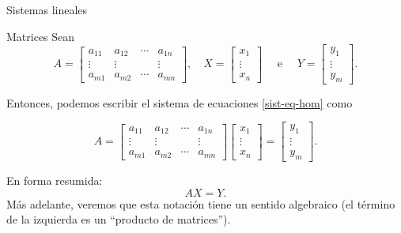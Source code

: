 \begin{chapter}{Sistemas lineales}
\begin{section}{Matrices}
            Sean
            \begin{equation*}
                A = \begin{bmatrix}
                    a_{11}& a_{12}& \cdots &a_{1n} \\
                    \vdots&\vdots  &  &\vdots \\
                    a_{m1} &a_{m2}&\cdots &a_{mn}
                    \end{bmatrix}, \quad 
                    X = \begin{bmatrix}
                    x_1 \\ \vdots \\ x_n
                    \end{bmatrix}\quad \text{ e } \quad
                    Y = \begin{bmatrix}
                    y_1 \\ \vdots \\ y_m
                    \end{bmatrix}. 
            \end{equation*}
                
            Entonces, podemos escribir el sistema de ecuaciones \eqref{sist-eq-hom} como
        
            \begin{equation}\label{sist-eq-homm-2}
                A = \begin{bmatrix}
                a_{11}& a_{12}& \cdots &a_{1n} \\
                \vdots&\vdots  &  &\vdots \\
                a_{m1} &a_{m2}&\cdots &a_{mn}
                \end{bmatrix}
                \begin{bmatrix}
                x_1  \\ \vdots \\  x_n
                \end{bmatrix} = 
                \begin{bmatrix}
                y_1 \\ \vdots \\ y_m
                \end{bmatrix}.
            \end{equation}
            
             En forma resumida:
            \begin{equation}\label{sis-eq-hom-2}
            AX = Y.
            \end{equation}
            Más adelante, veremos que esta notación tiene un sentido algebraico (el término de la izquierda es un ``producto de matrices'').
            

\end{section}
\end{chapter}
